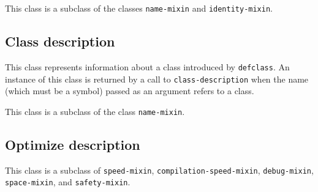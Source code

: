 This class is a subclass of the classes \texttt{name-mixin} and
\texttt{identity-mixin}.

\subsection{Class description}
\label{sec-instantiable-classes-class-desciption}

{\footnotesize
{}
}

This class represents information about a class introduced by
\texttt{defclass}.  An instance of this class is returned by a call to
\texttt{class-description} when the name (which must be a symbol)
passed as an argument refers to a class.

This class is a subclass of the class \texttt{name-mixin}.

\subsection{Optimize description}
\label{sec-instantiable-classes-optimize-desciption}

{\footnotesize
{}
}

This class is a subclass of \texttt{speed-mixin},
\texttt{compilation-speed-mixin}, \texttt{debug-mixin},
\texttt{space-mixin}, and \texttt{safety-mixin}.
